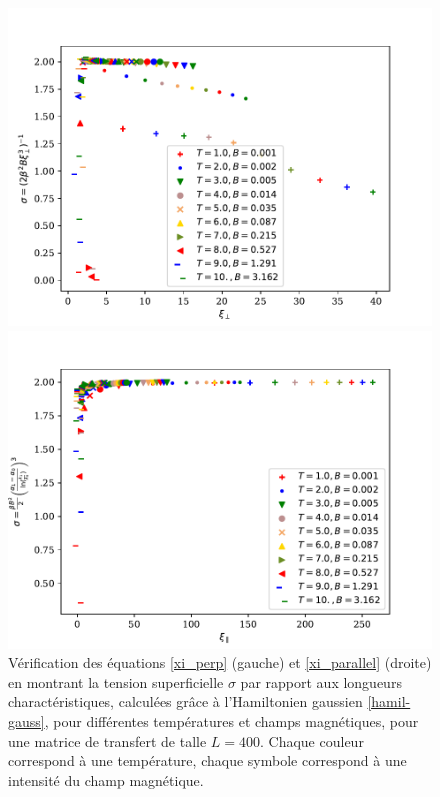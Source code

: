 \begin{figure}
	\begin{minipage}[t]{0.5\linewidth}
		\includegraphics[width=\linewidth]{sosequi-laser/sigma-perp.pdf}
	\end{minipage}%
	\begin{minipage}[t]{0.5\linewidth}
		\includegraphics[width=\linewidth]{sosequi-laser/sigma-para.pdf}
	\end{minipage}
	\caption{Vérification des équations \ref{xi_perp} (gauche) et \ref{xi_parallel} (droite) en montrant la tension superficielle $\sigma$ par rapport aux longueurs charactéristiques, calculées grâce à l'Hamiltonien gaussien \ref{hamil-gauss}, pour différentes températures et champs magnétiques, pour une matrice de transfert de talle $L=400$. Chaque couleur correspond à une température, chaque symbole correspond à une intensité du champ magnétique.}
	\label{tension-airy}
\end{figure}

